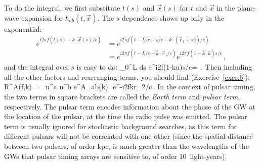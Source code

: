 To do the integral, we first substitute $t(s)$ and 
$\vec x(s)$ for $t$ and $\vec x$ in the plane-wave 
expansion for $h_{ab}(t,\vec x)$.
The $s$ dependence shows up only in the exponential:
%
\begin{equation}
\begin{aligned}
e^{i2\pi f(t(s)-\hat k\cdot\vec x(s)/c)}
&= e^{i2\pi f(t-L/c + s/c -\hat k\cdot(\vec r_1 + s\hat u)/c)}
\\
&= e^{i2\pi f(t-L/c -\hat k\cdot\vec r_1/c)}
e^{i2\pi f(1 -\hat k\cdot\hat u)s/c}\,,
\end{aligned}
\end{equation}
%
and the integral over $s$ is easy to do:
%
\be
\int_0^L {\rm d}s\>
e^{i2\pi f(1-\hat k\cdot\hat u)s/c}=
\,.
\ee
Then including all the other factors and rearranging terms, 
you should find (Exercise~\ref{exer:6}):
%
\be
R^A(f,\hat k) = \,
u^a u^b e^A_{ab}(\hat k)\,
\,e^{-i2\pi f\hat k\cdot\vec r_2/c}\,.
\label{e:response_one_arm_one_way}
\ee
%
In the context of pulsar timing, the two terms in square brackets 
are called the {\em Earth term} and {\em pulsar term}, respectively.
The pulsar term encodes information about the phase of the GW at
the location of the pulsar, at the time the radio pulse was emitted.
The pulsar term is usually ignored for stochastic background searches, as 
this term for different pulsars will not be correlated with one other
(since the spatial distance between two pulsars, of order kpc, 
is much greater than the wavelengths of the GWs that pulsar timing arrays are 
sensitive to, of order 10~light-years).

